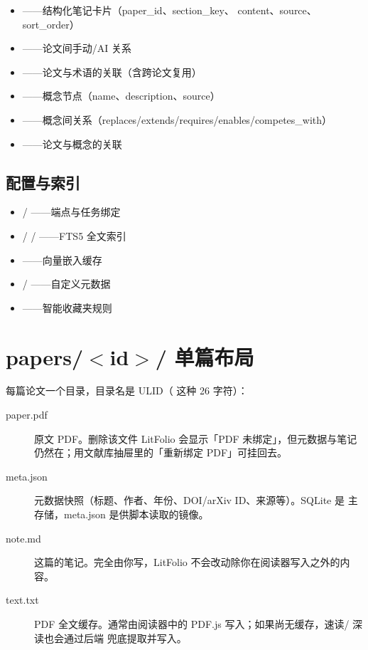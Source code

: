 \begin{itemize}
  \item {}——结构化笔记卡片（paper\_id、section\_key、
    content、source、sort\_order）
  \item {}——论文间手动/AI 关系
  \item {}——论文与术语的关联（含跨论文复用）
  \item {}——概念节点（name、description、source）
  \item {}——概念间关系（replaces/extends/requires/enables/competes\_with）
  \item {}——论文与概念的关联
\end{itemize}

\subsection{配置与索引}

\begin{itemize}
  \item {} / ——端点与任务绑定
  \item {} /  / ——FTS5 全文索引
  \item {}——向量嵌入缓存
  \item {} / ——自定义元数据
  \item {}——智能收藏夹规则
\end{itemize}

\section{papers/$<$id$>$/ 单篇布局}

每篇论文一个目录，目录名是 ULID（ 这种 26 字符）：

\begin{description}
  \item[paper.pdf] 原文 PDF。删除该文件 LitFolio 会显示「PDF 未绑定」，但元数据与笔记
    仍然在；用文献库抽屉里的「重新绑定 PDF」可挂回去。
  \item[meta.json] 元数据快照（标题、作者、年份、DOI/arXiv ID、来源等）。SQLite 是
    主存储，meta.json 是供脚本读取的镜像。
  \item[note.md] 这篇的笔记。完全由你写，LitFolio 不会改动除你在阅读器写入之外的内容。
  \item[text.txt] PDF 全文缓存。通常由阅读器中的 PDF.js 写入；如果尚无缓存，速读/
    深读也会通过后端  兜底提取并写入。
\end{description}

